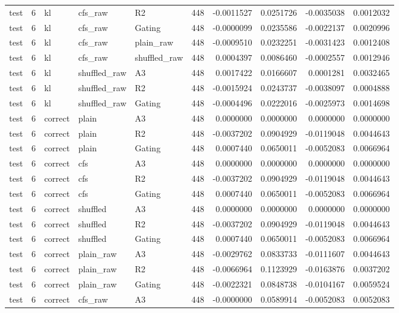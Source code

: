 \begin{tabular}{lrlllrrrrr}
test & 6 & kl & cfs_raw & R2 & 448 & -0.0011527 & 0.0251726 & -0.0035038 & 0.0012032 \\
test & 6 & kl & cfs_raw & Gating & 448 & -0.0000099 & 0.0235586 & -0.0022137 & 0.0020996 \\
test & 6 & kl & cfs_raw & plain_raw & 448 & -0.0009510 & 0.0232251 & -0.0031423 & 0.0012408 \\
test & 6 & kl & cfs_raw & shuffled_raw & 448 & 0.0004397 & 0.0086460 & -0.0002557 & 0.0012946 \\
test & 6 & kl & shuffled_raw & A3 & 448 & 0.0017422 & 0.0166607 & 0.0001281 & 0.0032465 \\
test & 6 & kl & shuffled_raw & R2 & 448 & -0.0015924 & 0.0243737 & -0.0038097 & 0.0004888 \\
test & 6 & kl & shuffled_raw & Gating & 448 & -0.0004496 & 0.0222016 & -0.0025973 & 0.0014698 \\
test & 6 & correct & plain & A3 & 448 & 0.0000000 & 0.0000000 & 0.0000000 & 0.0000000 \\
test & 6 & correct & plain & R2 & 448 & -0.0037202 & 0.0904929 & -0.0119048 & 0.0044643 \\
test & 6 & correct & plain & Gating & 448 & 0.0007440 & 0.0650011 & -0.0052083 & 0.0066964 \\
test & 6 & correct & cfs & A3 & 448 & 0.0000000 & 0.0000000 & 0.0000000 & 0.0000000 \\
test & 6 & correct & cfs & R2 & 448 & -0.0037202 & 0.0904929 & -0.0119048 & 0.0044643 \\
test & 6 & correct & cfs & Gating & 448 & 0.0007440 & 0.0650011 & -0.0052083 & 0.0066964 \\
test & 6 & correct & shuffled & A3 & 448 & 0.0000000 & 0.0000000 & 0.0000000 & 0.0000000 \\
test & 6 & correct & shuffled & R2 & 448 & -0.0037202 & 0.0904929 & -0.0119048 & 0.0044643 \\
test & 6 & correct & shuffled & Gating & 448 & 0.0007440 & 0.0650011 & -0.0052083 & 0.0066964 \\
test & 6 & correct & plain_raw & A3 & 448 & -0.0029762 & 0.0833733 & -0.0111607 & 0.0044643 \\
test & 6 & correct & plain_raw & R2 & 448 & -0.0066964 & 0.1123929 & -0.0163876 & 0.0037202 \\
test & 6 & correct & plain_raw & Gating & 448 & -0.0022321 & 0.0848738 & -0.0104167 & 0.0059524 \\
test & 6 & correct & cfs_raw & A3 & 448 & -0.0000000 & 0.0589914 & -0.0052083 & 0.0052083 \\

\end{tabular}
